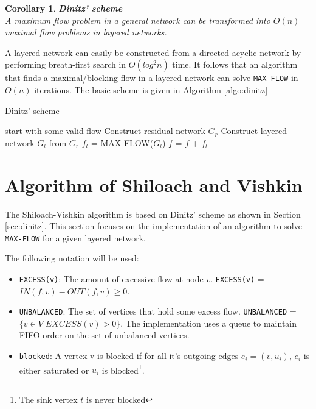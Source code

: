 \documentclass[a4paper,10pt, twocolumn]{article}
\newtheorem{corollary}[lemma]{Corollary}
\begin{document}
\begin{corollary}
\textbf{Dinitz' scheme} \cite{dinitz70} \\
A maximum flow problem in a general network can be transformed into $O(n)$ maximal flow problems in layered networks.
\end{corollary}

A layered network can easily be constructed from a directed acyclic network by performing breath-first search in  $O(log^{2}n)$ time. It follows that an algorithm that finds a maximal/blocking flow in a layered network can solve \lstinline|MAX-FLOW| in $O(n)$ iterations. The basic scheme is given in Algorithm \ref{algo:dinitz}

\begin{algorithm}
\caption{Dinitz' scheme}
\label{algo:dinitz}
\begin{algorithmic}[1]
	\State start with some valid flow 
		\State Construct residual network $G_r$ %
		\State Construct layered network $G_l$ from $G_r$ %
		\State $f_l$ = MAX-FLOW($G_l$)  %
		\State $f$ = $f$ + $f_l$ %
	\EndWhile
	\EndFunction
\end{algorithmic}
\end{algorithm}

\section{Algorithm of Shiloach and Vishkin}
\label{sec:shiloach}
The Shiloach-Vishkin algorithm is based on Dinitz' scheme as shown in Section \ref{sec:dinitz}. This section focuses on the implementation of an algorithm to solve \lstinline|MAX-FLOW| for a given layered network.

The following notation will be used:
\begin{itemize}
	\item \lstinline|EXCESS(v)|: The amount of excessive flow at node $v$. \lstinline|EXCESS(v)| = $IN(f,v) - OUT(f,v) \geq 0$.
	\item \lstinline|UNBALANCED|: The set of vertices that hold some excess flow. \lstinline|UNBALANCED| = $\{v \in V \lvert EXCESS(v) > 0 \}$. The implementation uses a queue to maintain FIFO order on the set of unbalanced vertices.
	\item \lstinline|blocked|: A vertex v is blocked if for all it's outgoing edges $e_i = (v, u_i)$, $e_i$ is either saturated or $u_i$ is blocked\footnote{The sink vertex $t$ is never blocked}. 
\end{itemize}
\end{document}
